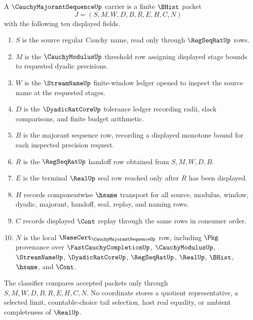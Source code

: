 \begin{definition}
\label{def:cauchy-majorant-sequence-carrier}
A $\CauchyMajorantSequenceUp$ carrier is a finite $\BHist$ packet
$$
J=(S,M,W,D,B,R,E,H,C,N)
$$
with the following ten displayed fields.
\begin{enumerate}
\item $S$ is the source regular Cauchy name, read only through $\RegSeqRatUp$ rows.
\item $M$ is the $\CauchyModulusUp$ threshold row assigning displayed stage bounds to requested dyadic precisions.
\item $W$ is the $\StreamNameUp$ finite-window ledger opened to inspect the source name at the requested stages.
\item $D$ is the $\DyadicRatCoreUp$ tolerance ledger recording radii, slack comparisons, and finite budget arithmetic.
\item $B$ is the majorant sequence row, recording a displayed monotone bound for each inspected precision request.
\item $R$ is the $\RegSeqRatUp$ handoff row obtained from $S,M,W,D,B$.
\item $E$ is the terminal $\RealUp$ seal row reached only after $R$ has been displayed.
\item $H$ records componentwise $\hsame$ transport for all source, modulus, window, dyadic, majorant, handoff, seal, replay, and naming rows.
\item $C$ records displayed $\Cont$ replay through the same rows in consumer order.
\item $N$ is the local $\NameCert_{\CauchyMajorantSequenceUp}$ row, including $\Pkg$ provenance over $\FastCauchyCompletionUp$, $\CauchyModulusUp$, $\StreamNameUp$, $\DyadicRatCoreUp$, $\RegSeqRatUp$, $\RealUp$, $\BHist$, $\hsame$, and $\Cont$.
\end{enumerate}
The classifier compares accepted packets only through $S,M,W,D,B,R,E,H,C,N$. No coordinate stores a quotient representative, a selected limit, countable-choice tail selection, host real equality, or ambient completeness of $\RealUp$.
\end{definition}

